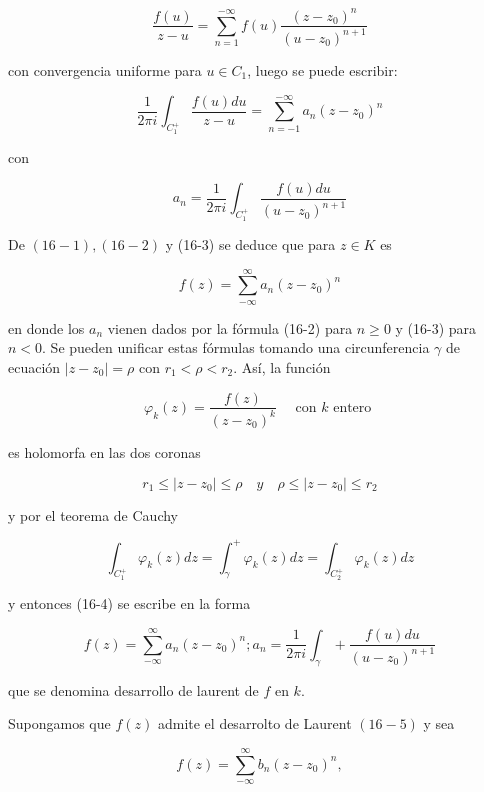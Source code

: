 \documentclass[10pt]{article}
\theoremstyle{plain}
\theoremstyle{definition}
\theoremstyle{remark}
\begin{document}
$$
\frac{f(u)}{z-u}=\sum_{n=1}^{-\infty} f(u) \frac{\left(z-z_{0}\right)^{n}}{\left(u-z_{0}\right)^{n+1}}
$$

con convergencia uniforme para $u \in C_{1}$, luego se puede escribir:

$$
\frac{1}{2 \pi i} \int_{C_{1}^{+}} \frac{f(u) d u}{z-u}=\sum_{n=-1}^{-\infty} a_{n}\left(z-z_{0}\right)^{n}
$$

con


\begin{equation*}
a_{n}=\frac{1}{2 \pi i} \int_{C_{1}^{+}} \frac{f(u) d u}{\left(u-z_{0}\right)^{n+1}} \tag{$16\cdot3$}
\end{equation*}


De $(16-1),(16-2)$ y (16-3) se deduce que para $z \in K$ es


\begin{equation*}
f(z)=\sum_{-\infty}^{\infty} a_{n}\left(z-z_{0}\right)^{n} \tag{16-4}
\end{equation*}


en donde los $a_{n}$ vienen dados por la fórmula (16-2) para $n \geqslant 0$ y (16-3) para $n<0$. Se pueden unificar estas fórmulas tomando una circunferencia $\gamma$ de ecuación $\left|z-z_{0}\right|=\rho$ con $r_{1}<\rho<r_{2}$. Así, la función

$$
\varphi_{k}(z)=\frac{f(z)}{\left(z-z_{0}\right)^{k}} \quad \text { con } k \text { entero }
$$

es holomorfa en las dos coronas

$$
r_{1} \leqslant\left|z-z_{0}\right| \leqslant \rho \quad y \quad \rho \leqslant\left|z-z_{0}\right| \leqslant r_{2}
$$

y por el teorema de Cauchy

$$
\int_{C_{1}^{+}} \varphi_{k}(z) d z=\int_{\gamma}^{+} \varphi_{k}(z) d z=\int_{C_{2}^{+}} \varphi_{k}(z) d z
$$

y entonces (16-4) se escribe en la forma


\begin{equation*}
f(z)=\sum_{-\infty}^{\infty} a_{n}\left(z-z_{0}\right)^{n} ; a_{n}=\frac{1}{2 \pi i} \int_{\gamma}+\frac{f(u) d u}{\left(u-z_{0}\right)^{n+1}} \tag{16-5}
\end{equation*}


que se denomina desarrollo de laurent de $f$ en $k$.

Supongamos que $f(z)$ admite el desarrolto de Laurent $(16-5)$ y sea

$$
f(z)=\sum_{-\infty}^{\infty} b_{n}\left(z-z_{0}\right)^{n},
$$
\end{document}
